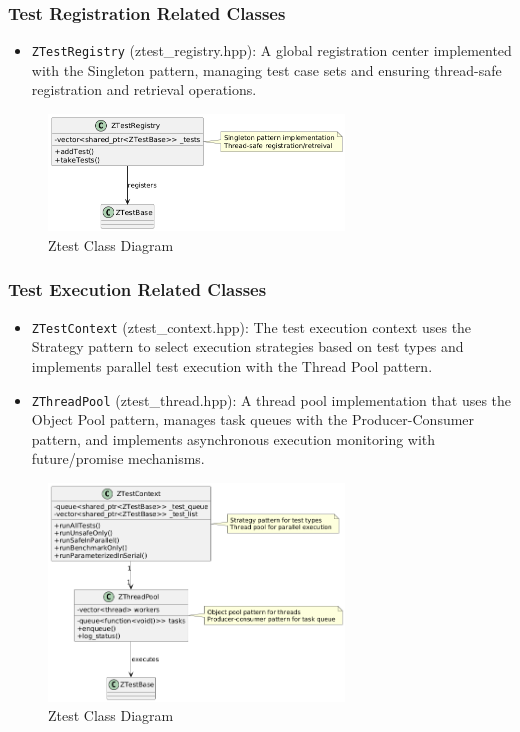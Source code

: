 \documentclass{article}
\begin{document}
\subsubsection{Test Registration Related Classes}
\begin{itemize}
    \item \texttt{ZTestRegistry} (ztest\_registry.hpp): A global registration center implemented with the Singleton pattern, managing test case sets and ensuring thread-safe registration and retrieval operations.
\end{itemize}
\begin{figure}[H]
    \centering
    \includegraphics[width = 0.7\textwidth]{img/c2.png} %
    \caption{Ztest Class Diagram}
    \label{fig:ztest class }
\end{figure}
\subsubsection{Test Execution Related Classes}
\begin{itemize}
    \item \texttt{ZTestContext} (ztest\_context.hpp): The test execution context uses the Strategy pattern to select execution strategies based on test types and implements parallel test execution with the Thread Pool pattern.
    \item \texttt{ZThreadPool} (ztest\_thread.hpp): A thread pool implementation that uses the Object Pool pattern, manages task queues with the Producer-Consumer pattern, and implements asynchronous execution monitoring with future/promise mechanisms.
\end{itemize}
\begin{figure}[H]
    \centering
    \includegraphics[width = 0.7\textwidth]{img/c3.png} %
    \caption{Ztest Class Diagram}
    \label{fig:ztest class }
\end{figure}
\end{document}

